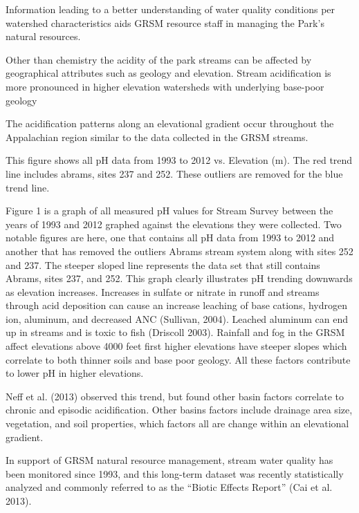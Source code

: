 Information leading to a better understanding of water quality conditions per watershed characteristics aids GRSM resource staff in managing the Park’s natural resources.  

Other than chemistry the acidity of the park streams can be affected by geographical attributes such as geology and elevation. 
Stream acidification is more pronounced in higher elevation watersheds with underlying base-poor geology 

The acidification patterns along an elevational gradient occur throughout the Appalachian region similar to the data collected in the GRSM streams.  

This figure shows all pH data from 1993 to 2012 vs. Elevation (m).  
The red trend line includes abrams,  sites 237 and 252.  
These outliers are removed for the blue trend line.

Figure 1 is a graph of all measured pH values for Stream Survey between the years of 1993 and 2012 graphed against the elevations they were collected.  
Two notable figures are here, one that contains all pH data from 1993 to 2012 and another that has removed the outliers Abrams stream system along with sites 252 and 237.  
The steeper sloped line represents the data set that still contains Abrams, sites 237, and 252.  
This graph clearly illustrates pH trending downwards as elevation increases.  
Increases in sulfate or nitrate in runoff and streams through acid deposition can cause an increase leaching of base cations, hydrogen ion, aluminum, and decreased ANC (Sullivan, 2004).  Leached aluminum can end up in streams and is toxic to fish (Driscoll 2003).  
Rainfall and fog in the GRSM affect elevations above 4000 feet first higher elevations have steeper slopes which correlate to both thinner soils and base poor geology.  
All these factors contribute to lower pH in higher elevations.  

Neff et al. (2013) observed this trend, but found other basin factors correlate to chronic and episodic acidification.  
Other basins factors include drainage area size, vegetation, and soil properties, which factors all are change within an elevational gradient.  

In support of GRSM natural resource management, stream water quality has been monitored since 1993, and this long-term dataset was recently statistically analyzed and commonly referred to as the “Biotic Effects Report” (Cai et al. 2013).  


